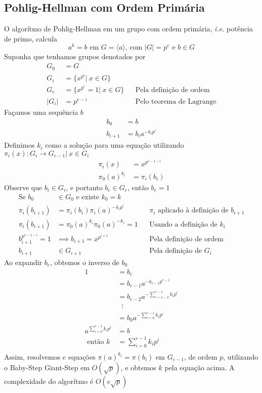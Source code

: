 \documentclass{article}
\begin{document}
\subsection{Pohlig-Hellman com Ordem Primária}
O algorítmo de Pohlig-Hellman em um grupo com ordem primária, \emph{i.e.} potência de primo, calcula
$$ a^k = b \text{ em } G = \langle a \rangle\text{, com }|G| = p^e\text{ e }b \in G$$
Suponha que tenhamos grupos denotados por
\begin{align*}
    G_0 &= G\\
    G_i &= \lbrace x^{p^i} \vert\ x \in G \rbrace\\
    G_e &= \lbrace x^{p^e} = 1 \vert\ x \in G \rbrace   &&\text{Pela definição de ordem}\\
  |G_i| &= p^{e-i}                                      &&\text{Pelo teorema de Lagrange}
\end{align*}
Façamos uma sequência $b$
\begin{align*}
    b_0 &= b\\
    b_{i+1} &= b_i a^{-k_i p^{i}}
\end{align*}
Definimos $k_i$ como a solução para uma equação utilizando $\pi_i(x) : G_i \rightarrow G_{e-1} |\ x \in G_i$
\begin{align*}
    \pi_i(x) &= x^{p^{e-1-i}}\\
    \pi_0(a)^{k_i} &= \pi_i(b_i)
\end{align*}
Observe que $b_i \in G_i$, e portanto $b_e \in G_e$, então $b_e = 1$
\begin{align*}
    \text{Se }b_0 &\in G_0\text{ e existe }k_0 = k\\
    \pi_i(b_{i+1}) &= \pi_i(b_i)\pi_i(a)^{-k_ip^i}          &&\text{$\pi_i$ aplicado à definição de $b_{i+1}$}\\
    \pi_i(b_{i+1}) &= \pi_0(a)^{k_i}\pi_0(a)^{-k_i} = 1     &&\text{Usando a definição de $k_i$}\\
    b_{i+1}^{p^{e-1-i}} = 1 &\implies b_{i+1} = x^{p^{i+1}} &&\text{Pela definição de ordem}\\
    b_{i+1} &\in G_{i+1}                                    &&\text{Pela definição de $G_i$}
\end{align*}
Ao expandir $b_e$, obtemos o inverso de $b_0$
\begin{align*}
    1 &= b_e\\
    &= b_{e-1}a^{-k_{e-1} p^{e-1}}\\
    &= b_{e-2}a^{-\sum_{i=e-2}^{e-1}{k_i p^i}}\\
    &\;\;\vdots\\
    &= b_{0}a^{-\sum_{i=0}^{e-1}{k_i p^i}}\\
    a^{\sum_{i=0}^{e-1}{k_i p^i}} &= b\\
  \text{ então } k &= \sum_{i=0}^{e-1}{k_i p^i}\\
\end{align*}
Assim, resolvemos $e$ equações $\pi(a)^{k_i} = \pi(b_i)$ em $G_{e-1}$, de ordem $p$, utilizando o Baby-Step Giant-Step em $O(\sqrt{p})$, e obtemos $k$ pela equação acima. A complexidade do algorítmo é $O(e\sqrt{p})$
\end{document}
